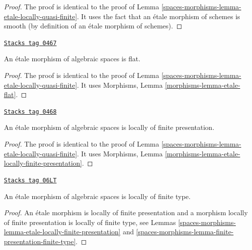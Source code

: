 \begin{proof}
The proof is identical to the proof of
Lemma \ref{spaces-morphisms-lemma-etale-locally-quasi-finite}.
It uses the fact that an \'etale morphism of schemes is smooth
(by definition of an \'etale morphism of schemes).
\end{proof}

\begin{lemma}
\label{spaces-morphisms-lemma-etale-flat}
\href{https://stacks.math.columbia.edu/tag/0467}{\texttt{Stacks tag 0467}}

An \'etale morphism of algebraic spaces is flat.
\end{lemma}

\begin{proof}
The proof is identical to the proof of
Lemma \ref{spaces-morphisms-lemma-etale-locally-quasi-finite}.
It uses
Morphisms, Lemma \ref{morphisms-lemma-etale-flat}.
\end{proof}

\begin{lemma}
\label{spaces-morphisms-lemma-etale-locally-finite-presentation}
\href{https://stacks.math.columbia.edu/tag/0468}{\texttt{Stacks tag 0468}}


An \'etale morphism of algebraic spaces is locally of finite presentation.
\end{lemma}

\begin{proof}
The proof is identical to the proof of
Lemma \ref{spaces-morphisms-lemma-etale-locally-quasi-finite}.
It uses
Morphisms, Lemma \ref{morphisms-lemma-etale-locally-finite-presentation}.
\end{proof}

\begin{lemma}
\label{spaces-morphisms-lemma-etale-locally-finite-type}
\href{https://stacks.math.columbia.edu/tag/06LT}{\texttt{Stacks tag 06LT}}

An \'etale morphism of algebraic spaces is locally of finite type.
\end{lemma}

\begin{proof}
An \'etale morphism is locally of finite presentation
and a morphism locally of finite presentation is locally of finite type,
see
Lemmas \ref{spaces-morphisms-lemma-etale-locally-finite-presentation} and
\ref{spaces-morphisms-lemma-finite-presentation-finite-type}.
\end{proof}

